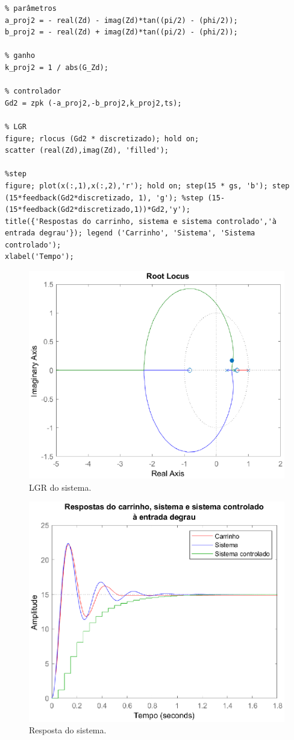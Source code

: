 \documentclass{article}
\begin{document}
\begin{lstlisting}
% parâmetros
a_proj2 = - real(Zd) - imag(Zd)*tan((pi/2) - (phi/2));
b_proj2 = - real(Zd) + imag(Zd)*tan((pi/2) - (phi/2));

% ganho
k_proj2 = 1 / abs(G_Zd);

% controlador
Gd2 = zpk (-a_proj2,-b_proj2,k_proj2,ts);

% LGR
figure; rlocus (Gd2 * discretizado); hold on;
scatter (real(Zd),imag(Zd), 'filled');

%step
figure; plot(x(:,1),x(:,2),'r'); hold on; step(15 * gs, 'b'); step (15*feedback(Gd2*discretizado, 1), 'g'); %step (15-(15*feedback(Gd2*discretizado,1))*Gd2,'y');
title({'Respostas do carrinho, sistema e sistema controlado','à entrada degrau'}); legend ('Carrinho', 'Sistema', 'Sistema controlado');
xlabel('Tempo');
\end{lstlisting}

\begin{figure}[H]
    \centering
        \includegraphics[width=.8\linewidth]{images/Matlab/identifica_05.eps}
        \caption{LGR do sistema.}\label{fig:lgr_controlador2}
\end{figure}
\begin{figure}[H]
    \centering
        \includegraphics[width=.8\linewidth]{images/Matlab/identifica_06.eps}
        \caption{Resposta do sistema.}\label{fig:resposta_controlador2}
\end{figure}
\end{document}
